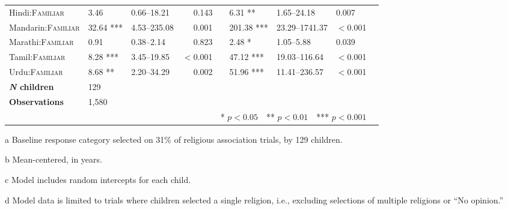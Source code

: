 \begin{table}[ht]
\begin{threeparttable}
\begin{tabular}{lllrllllr}
Hindi:\textsc{Familiar} & 3.46 & 0.66--18.21 & 0.143 &  & 6.31 ** & 1.65--24.18 & 0.007 \\ 
Mandarin:\textsc{Familiar} & 32.64 *** & 4.53--235.08 & 0.001 &  & 201.38 *** & 23.29--1741.37 & $<$0.001 \\ 
Marathi:\textsc{Familiar} & 0.91 & 0.38--2.14 & 0.823 &  & 2.48 * & 1.05--5.88 & 0.039 \\ 
Tamil:\textsc{Familiar} & 8.28 *** & 3.45--19.85 & $<$0.001 &  & 47.12 *** & 19.03--116.64 & $<$0.001 \\ 
Urdu:\textsc{Familiar} & 8.68 ** & 2.20--34.29 & 0.002 &  & 51.96 *** & 11.41--236.57 & $<$0.001 \\ 
\midrule
\bfseries{\textit{N} children}\tnote{c} & 129&   &  &  &  &  \\
\textbf{Observations}\tnote{d} & 1,580  &  &  &  &  &  &  \\
\bottomrule
\multicolumn{8}{r}{* $p<0.05$~~** $p<0.01$~~*** $p<0.001$}\\
\end{tabular}
\begin{tablenotes}[flushleft]
    \item[a] Baseline response category selected on 31\% of religious association trials, by 129 children. %
    \item[b] Mean-centered, in years.
    \item[c] Model includes random intercepts for each child.
    \item[d] Model data is limited to trials where children selected a single religion, i.e., excluding selections of multiple religions or ``No opinion.'' 
\end{tablenotes}
\end{threeparttable}
\end{table}